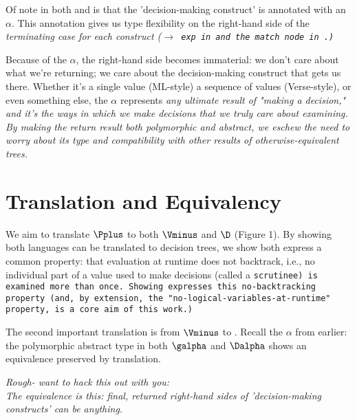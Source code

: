 \documentclass{article}
\begin{document}
Of note in both \Vminus and \D is that the 'decision-making construct' is 
annotated with an $\alpha$. This annotation gives us type flexibility on the 
right-hand side of the \it{terminating} case for each construct 
(\tt{$\rightarrow$ exp} in \Vminus and the match node in \D.) 

Because of the $\alpha$, the right-hand side becomes immaterial: we don't care
about what we're returning; we care about the decision-making construct that
gets us there. Whether it's a single value (ML-style) a sequence of values
(Verse-style), or even something else, the $\alpha$ represents \it{any} ultimate
result of "making a decision," and it's the ways in which we make decisions that
we truly care about examining. By making the return result both polymorphic and
abstract, we eschew the need to worry about its type and compatibility with
other results of otherwise-equivalent trees. 

\section{Translation and Equivalency}

We aim to translate $\Pplus$ to both $\Vminus$ and $\D$ (Figure 1). By showing both
languages can be translated to decision trees, we show both express a common
property: that evaluation at runtime does not backtrack, i.e., no individual
part of a value used to make decisions (called a \tt{scrutinee}) is examined
more than once. Showing \Vminus expresses this no-backtracking property (and, by
extension, the "no-logical-variables-at-runtime" property, is a core aim of this
work.)

The second important translation is from $\Vminus$ to \D. Recall the $\alpha$ from
earlier: the polymorphic abstract type in both $\galpha$ and $\Dalpha$ shows
an equivalence preserved by translation. 

\it{Rough- want to hack this out with you:} \\
The equivalence is this: final, returned right-hand sides of 'decision-making 
constructs' can be anything. 
\end{document}
